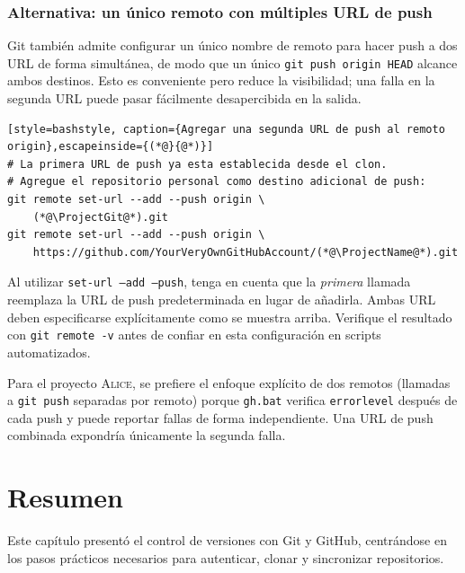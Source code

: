 \subsubsection{Alternativa: un único remoto con múltiples URL de push}

Git también admite configurar un único nombre de remoto para hacer push a dos URL
de forma simultánea, de modo que un único \texttt{git push origin HEAD} alcance
ambos destinos. Esto es conveniente pero reduce la visibilidad; una falla
en la segunda URL puede pasar fácilmente desapercibida en la salida.

\begin{lstlisting}[style=bashstyle, caption={Agregar una segunda URL de push al remoto origin},escapeinside={(*@}{@*)}]
# La primera URL de push ya esta establecida desde el clon.
# Agregue el repositorio personal como destino adicional de push:
git remote set-url --add --push origin \
    (*@\ProjectGit@*).git
git remote set-url --add --push origin \
    https://github.com/YourVeryOwnGitHubAccount/(*@\ProjectName@*).git
\end{lstlisting}

\begin{warningbox}
Al utilizar \texttt{set-url --add --push}, tenga en cuenta que la \emph{primera}
llamada reemplaza la URL de push predeterminada en lugar de añadirla. Ambas URL
deben especificarse explícitamente como se muestra arriba. Verifique el resultado con
\texttt{git remote -v} antes de confiar en esta configuración en
scripts automatizados.
\end{warningbox}

Para el proyecto \textsc{Alice}, se prefiere el enfoque explícito de dos remotos
(llamadas a \texttt{git push} separadas por remoto) porque
\texttt{gh.bat} verifica \texttt{errorlevel} después de cada push y puede
reportar fallas de forma independiente. Una URL de push combinada expondría únicamente
la segunda falla.

\section{Resumen}
\label{sec:git-summary}

Este capítulo presentó el control de versiones con Git y GitHub, centrándose en
los pasos prácticos necesarios para autenticar, clonar y sincronizar
repositorios.

